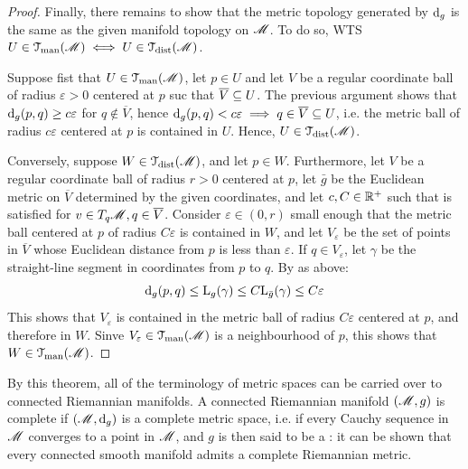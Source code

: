 \begin{proofbox}
\begin{proof}
    Finally, there remains to show that the metric topology generated by $ \mathrm{d}_g $ is the same as the given manifold topology on $ \mathscr{M} $. To do so, WTS $ U \in \EuScript{T}_\text{man}(\mathscr{M}) \iff U \in \EuScript{T}_\text{dist}(\mathscr{M}) $.

    Suppose fist that $ U \in \EuScript{T}_\text{man}(\mathscr{M}) $, let $ p \in U $ and let $ V $ be a regular coordinate ball of radius $ \varepsilon > 0 $ centered at $ p $ suc that $ \overline{V} \subseteq U $. The previous argument shows that $ \mathrm{d}_g(p,q) \geq c \varepsilon $ for $ q \notin \overline{V} $, hence $ \mathrm{d}_g(p,q) < c \varepsilon \implies q \in \overline{V} \subseteq U $, i.e. the metric ball of radius $ c \varepsilon $ centered at $ p $ is contained in $ U $. Hence, $ U \in \EuScript{T}_\text{dist}(\mathscr{M}) $.

    Conversely, suppose $ W \in \EuScript{T}_\text{dist}(\mathscr{M}) $, and let $ p \in W $. Furthermore, let $ V $ be a regular coordinate ball of radius $ r > 0 $ centered at $ p $, let $ \bar{g} $ be the Euclidean metric on $ \overline{V} $ determined by the given coordinates, and let $ c , C \in \mathbb{R}^+ $ such that  is satisfied for $ v \in T_q\mathscr{M} , q \in \overline{V} $. Consider $ \varepsilon \in (0,r) $ small enough that the metric ball centered at $ p $ of radius $ C \varepsilon $ is contained in $ W $, and let $ V_\varepsilon $ be the set of points in $ \overline{V} $ whose Euclidean distance from $ p $ is less than $ \varepsilon $. If $ q \in V_\varepsilon $, let $ \gamma $ be the straight-line segment in coordinates from $ p $ to $ q $. By  as above:
    \begin{equation*}
      \mathrm{d}_g(p,q) \leq \mathrm{L}_g(\gamma) \leq C \mathrm{L}_{\bar{g}}(\gamma) \leq C \varepsilon
    \end{equation*}
    This shows that $ V_\varepsilon $ is contained in the metric ball of radius $ C \varepsilon $ centered at $ p $, and therefore in $ W $. Sinve $ V_\varepsilon \in \EuScript{T}_\text{man}(\mathscr{M}) $ is a neighbourhood of $ p $, this shows that $ W \in \EuScript{T}_\text{man}(\mathscr{M}) $.
  \end{proof}
\end{proofbox}

By this theorem, all of the terminology of metric spaces can be carried over to connected Riemannian manifolds. A connected Riemannian manifold $ (\mathscr{M},g) $ is complete if $ (\mathscr{M},\mathrm{d}_g) $ is a complete metric space, i.e. if every Cauchy sequence in $ \mathscr{M} $ converges to a point in $ \mathscr{M} $, and $ g $ is then said to be a : it can be shown that every connected smooth manifold admits a complete Riemannian metric.

